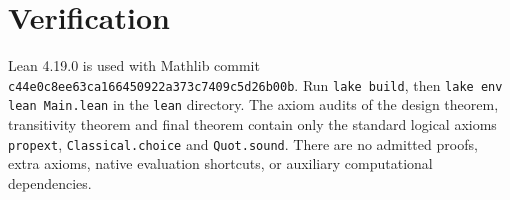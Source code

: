 \documentclass[11pt,a4paper]{article}
\begin{document}
\section{Verification}
Lean 4.19.0 is used with Mathlib commit
\texttt{c44e0c8ee63ca166450922a373c7409c5d26b00b}.
Run \texttt{lake build}, then \texttt{lake env lean Main.lean} in the
\texttt{lean} directory. The axiom audits of the design theorem,
transitivity theorem and final theorem contain only the standard logical
axioms \texttt{propext}, \texttt{Classical.choice} and \texttt{Quot.sound}.
There are no admitted proofs, extra axioms, native evaluation shortcuts,
or auxiliary computational dependencies.
\end{document}
